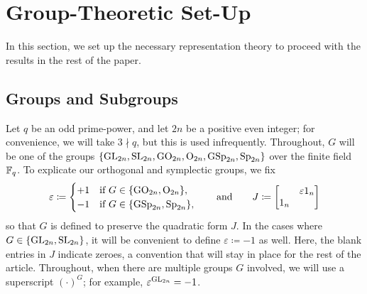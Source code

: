 
\section{Group-Theoretic Set-Up} \label{sec:rep-theory}
In this section, we set up the necessary representation theory to proceed with the results in the rest of the paper.

\subsection{Groups and Subgroups}
Let $q$ be an odd prime-power, and let $2n$ be a positive even integer; for convenience, we will take $3\nmid q$, but this is used infrequently. Throughout, $G$ will be one of the groups $\{{\mathrm{GL}}_{2n},{\mathrm{SL}}_{2n},\mathrm{GO}_{2n},\mathrm{O}_{2n},\mathrm{GSp}_{2n},\mathrm{Sp}_{2n}\}$ over the finite field $\mathbb F_q$. To explicate our orthogonal and symplectic groups, we fix
\[\varepsilon\coloneqq\begin{cases}
    +1 & \text{if }G\in\{\mathrm{GO}_{2n},\mathrm{O}_{2n}\}, \\
    -1 & \text{if }G\in\{\mathrm{GSp}_{2n},\mathrm{Sp}_{2n}\},
\end{cases}\qquad\text{and}\qquad J\coloneqq\begin{bmatrix}
    & \varepsilon1_n \\
    1_n
\end{bmatrix}\]
so that $G$ is defined to preserve the quadratic form $J$. In the cases where $G\in\{\mathrm{GL}_{2n},\mathrm{SL}_{2n}\}$, it will be convenient to define $\varepsilon\coloneqq-1$ as well. Here, the blank entries in $J$ indicate zeroes, a convention that will stay in place for the rest of the article. Throughout, when there are multiple groups $G$ involved, we will use a superscript $(\cdot)^G$; for example, $\varepsilon^{\mathrm{GL}_{2n}}=-1$.

